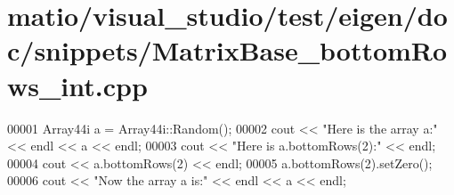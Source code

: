 \hypertarget{matio_2visual__studio_2test_2eigen_2doc_2snippets_2_matrix_base__bottom_rows__int_8cpp_source}{}\section{matio/visual\+\_\+studio/test/eigen/doc/snippets/\+Matrix\+Base\+\_\+bottom\+Rows\+\_\+int.cpp}
\label{matio_2visual__studio_2test_2eigen_2doc_2snippets_2_matrix_base__bottom_rows__int_8cpp_source}

\begin{DoxyCode}
00001 Array44i a = Array44i::Random();
00002 cout << \textcolor{stringliteral}{"Here is the array a:"} << endl << a << endl;
00003 cout << \textcolor{stringliteral}{"Here is a.bottomRows(2):"} << endl;
00004 cout << a.bottomRows(2) << endl;
00005 a.bottomRows(2).setZero();
00006 cout << \textcolor{stringliteral}{"Now the array a is:"} << endl << a << endl;
\end{DoxyCode}
